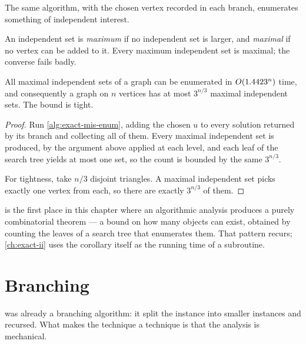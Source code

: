 The same algorithm, with the chosen vertex recorded in each branch, enumerates
something of independent interest.

\begin{definition}\label{def:maximal-independent-set}
An independent set is \emph{maximum} if no independent set is larger, and
\emph{maximal} if no vertex can be added to it. Every maximum independent set
is maximal; the converse fails badly.
\end{definition}

\begin{corollary}\label{cor:moon-moser}
All maximal independent sets of a graph can be enumerated in
$O\!\left(1.4423^n\right)$ time, and consequently a graph on $n$ vertices has at most
$3^{n/3}$ maximal independent sets. The bound is tight.
\end{corollary}

\begin{proof}
Run \cref{alg:exact-mis-enum}, adding the chosen $u$ to every solution returned
by its branch and collecting all of them. Every maximal independent set is
produced, by the argument above applied at each level, and each leaf of the
search tree yields at most one set, so the count is bounded by the same
$3^{n/3}$.

For tightness, take $n/3$ disjoint triangles. A maximal independent set picks
exactly one vertex from each, so there are exactly $3^{n/3}$ of them.
\end{proof}

\begin{intuition}
 is the first place in this chapter where an algorithmic
analysis produces a purely combinatorial theorem --- a bound on how many
objects can exist, obtained by counting the leaves of a search tree that
enumerates them. That pattern recurs; \cref{ch:exact-ii} uses the corollary
itself as the running time of a subroutine.
\end{intuition}

\section{Branching}
\label{sec:branching}

 was already a branching algorithm: it split the
instance into smaller instances and recursed. What makes the technique a
technique is that the analysis is mechanical.

